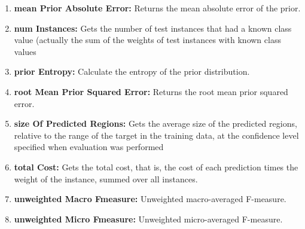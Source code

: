\documentclass[a4paper,12pt, english]{article}
\begin{document}
\begin{enumerate}
          
\item \textbf{mean Prior Absolute Error: }
          Returns the mean absolute error of the prior.
          


\item \textbf{num Instances: }
          Gets the number of test instances that had a known class value (actually the sum of the weights of test instances with known class values

      
      



\item \textbf{prior Entropy: }
          Calculate the entropy of the prior distribution.    
                    
\item \textbf{root Mean Prior Squared Error: }
          Returns the root mean prior squared error.          
          
          
             
\item \textbf{size Of Predicted Regions: }
          Gets the average size of the predicted regions, relative to the range of the target in the training data, at the confidence level specified when evaluation was performed

\item \textbf{total Cost: }
          Gets the total cost, that is, the cost of each prediction times the weight of the instance, summed over all instances.                   

\item \textbf{unweighted Macro Fmeasure: }
          Unweighted macro-averaged F-measure.
          
\item \textbf{unweighted Micro Fmeasure: }
          Unweighted micro-averaged F-measure.          


\end{enumerate}
\end{document}
